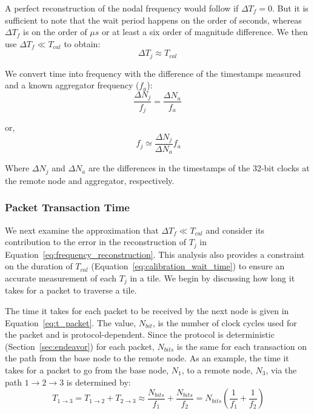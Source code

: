 A perfect reconstruction of the nodal frequency would follow if $\Delta T_{f} = 0$.
But it is sufficient to note that the wait period happens on the order of seconds, whereas $\Delta T_{f}$ is on the order of $\mu s$ or at least a six order of magnitude difference.
We then use $\Delta T_{f} \ll T_{cal}$ to obtain:
\begin{equation}
  \Delta T_{j} \approx T_{cal}
\end{equation}

We convert time into frequency with the difference of the timestamps measured and a known aggregator frequency ($f_{a}$):
\begin{equation}
   \frac{\Delta N_{j}}{f_{j}} = \frac{\Delta N_{a}}{f_{a}}
\end{equation}

or,
\begin{equation}~\label{eq:frequency_reconstruction}
   \boxed{f_{j} \simeq \frac{\Delta N_{j}}{\Delta N_{a}}f_{a}}
\end{equation}

Where $\Delta N_{j}$ and $\Delta N_{a}$ are the differences in the timestamps of the 32-bit clocks at the remote node and aggregator, respectively.


\subsubsection{Packet Transaction Time}
We next examine the approximation that $\Delta T_{f} \ll T_{cal}$ and consider its contribution to the error in the reconstruction of $T_{j}$ in Equation~\ref{eq:frequency_reconstruction}.
This analysis also provides a constraint on the duration of $T_{cal}$ (Equation~\ref{eq:calibration_wait_time}) to ensure an accurate measurement of each $T_{j}$ in a tile.
We begin by discussing how long it takes for a packet to traverse a tile.

The time it takes for each packet to be received by the next node is given in Equation~\ref{eq:t_packet}.
The value, $N_{bit}$, is the number of clock cycles used for the packet and is protocol-dependent.
Since the protocol is deterministic (Section~\ref{sec:endeavor}) for each packet, $N_{bits}$ is the same for each transaction on the path from the base node to the remote node.
As an example, the time it takes for a packet to go from the base node, $N_{1}$, to a remote node, $N_{3}$, via the path $1\rightarrow 2 \rightarrow 3$ is determined by:
\begin{equation}~\label{eq:t_packetTransfer}
  T_{1\rightarrow 3} = T_{1\rightarrow 2} + T_{2\rightarrow 3} \approx \frac{N_{bits}}{f_{1}} + \frac{N_{bits}}{f_{2}} = N_{bits}(\frac{1}{f_{1}} + \frac{1}{f_{2}})
\end{equation}

